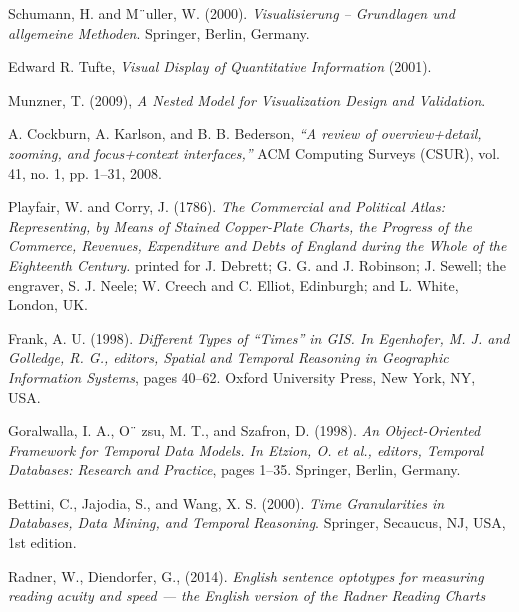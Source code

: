 \documentclass[12pt]{article}
\begin{document}
\begin{thebibliography}{1}

   Schumann, H. and M¨uller, W. (2000). {\em Visualisierung – Grundlagen und allgemeine Methoden}. Springer, Berlin, Germany.

    Edward R. Tufte, {\em Visual Display of Quantitative Information} (2001).

   Munzner, T. (2009), {\em A Nested Model for Visualization Design and Validation}.

   A. Cockburn, A. Karlson, and B. B. Bederson, {\em “A review of overview+detail, zooming, and focus+context interfaces,”} ACM Computing Surveys (CSUR), vol. 41, no. 1, pp. 1–31, 2008.
  
   Playfair, W. and Corry, J. (1786). {\em The Commercial and Political Atlas: Representing, by Means of Stained Copper-Plate Charts, the Progress of the Commerce, Revenues, Expenditure and Debts of England during the Whole of the Eighteenth Century.} printed for J. Debrett; G. G. and J. Robinson; J. Sewell; the engraver, S. J. Neele; W. Creech and C. Elliot, Edinburgh; and L. White, London, UK.
  
   Frank, A. U. (1998). {\em Different Types of “Times” in GIS. In Egenhofer, M. J. and Golledge, R. G., editors, Spatial and Temporal Reasoning in Geographic Information Systems}, pages 40–62. Oxford University Press, New York, NY, USA.
  
   Goralwalla, I. A., O¨ zsu, M. T., and Szafron, D. (1998). {\em An Object-Oriented Framework for Temporal Data Models. In Etzion, O. et al., editors, Temporal Databases: Research and Practice}, pages 1–35. Springer, Berlin, Germany.
  
   Bettini, C., Jajodia, S., and Wang, X. S. (2000). {\em Time Granularities in Databases, Data Mining, and Temporal Reasoning}. Springer, Secaucus, NJ, USA, 1st edition.

   Radner, W., Diendorfer, G., (2014). {\em English sentence optotypes for measuring reading acuity and speed --- the English version of the Radner Reading Charts}

  \end{thebibliography}
\end{document}
